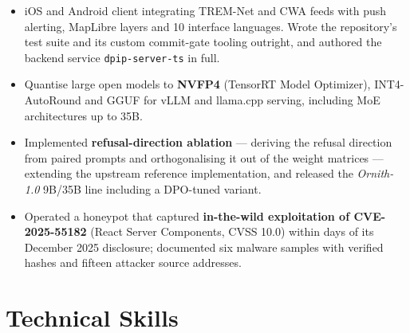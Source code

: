 \documentclass[10pt,a4paper]{article}
\begin{document}
\begin{itemize}
  \item iOS and Android client integrating TREM-Net and CWA feeds with push alerting, MapLibre layers and
        10 interface languages. Wrote the repository's test suite and its custom commit-gate tooling outright,
        and authored the backend service \texttt{dpip-server-ts} in full.
\end{itemize}

\begin{itemize}
  \item Quantise large open models to \textbf{NVFP4} (TensorRT Model Optimizer), INT4-AutoRound and GGUF for
        vLLM and llama.cpp serving, including MoE architectures up to 35B.
  \item Implemented \textbf{refusal-direction ablation} — deriving the refusal direction from paired prompts and
        orthogonalising it out of the weight matrices — extending the upstream reference implementation, and
        released the \textit{Ornith-1.0} 9B/35B line including a DPO-tuned variant.
\end{itemize}

\begin{itemize}
  \item Operated a honeypot that captured \textbf{in-the-wild exploitation of CVE-2025-55182} (React Server
        Components, CVSS 10.0) within days of its December 2025 disclosure; documented six malware samples with
        verified hashes and fifteen attacker source addresses.
\end{itemize}

\section{Technical Skills}
\end{document}
